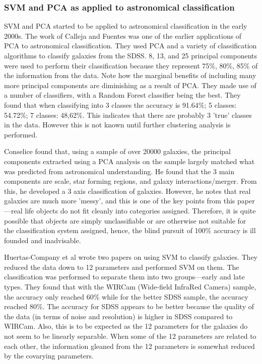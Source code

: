 \documentclass[a4paper,11pt]{article}
\begin{document}
\subsubsection{SVM and PCA as applied to astronomical classification}
SVM and PCA started to be applied to astronomical classification in the early 2000s. The work of Calleja and Fuentes was one of the earlier applications of PCA to astronomical classification.\cite{delacalleja_2004_automated} They used PCA and a variety of classification algorithms to classify galaxies from the SDSS. 8, 13, and 25 principal components were used to perform their classification because they represent 75\%, 80\%, 85\% of the information from the data. Note how the marginal benefits of including many more principal components are diminishing as a result of PCA. They made use of a number of classifiers, with a Random Forest classifier being the best. They found that when classifying into 3 classes the accuracy is 91.64\%; 5 classes: 54.72\%; 7 classes: 48,62\%. This indicates that there are probably 3 'true' classes in the data. However this is not known until further clustering analysis is performed.

Conselice \cite{conselice_2006_the} found that, using a sample of over 20000 galaxies, the principal components extracted using a PCA analysis on the sample largely matched what was predicted from astronomical understanding. He found that the 3 main components are scale, star forming regions, and galaxy interactions/merger. From this, he developed a 3 axis classification of galaxies. However, he notes that real galaxies are much more 'messy', and this is one of the key points from this paper \cite{conselice_2006_the} —real life objects do not fit cleanly into categories assigned. Therefore, it is quite possible that objects are simply unclassifiable or are otherwise not suitable for the classification system assigned, hence, the blind pursuit of 100\% accuracy is ill founded and inadvisable.

Huertas-Company et al \cite{huertascompany_2007_a} wrote two papers on using SVM to classify galaxies. They reduced the data down to 12 parameters and performed SVM on them. The classification was performed to separate them into two groups—early and late types. They found that with the WIRCam (Wide-field InfraRed Camera) sample, the accuracy only reached 60\% while for the better SDSS sample, the accuracy reached 80\%. The accuracy for SDSS appears to be better because the quality of the data (in terms of noise and resolution) is higher in SDSS compared to WIRCam. Also, this is to be expected as the 12 parameters for the galaxies do not seem to be linearly separable. When some of the 12 parameters are related to each other, the information gleaned from the 12 parameters is somewhat reduced by the covarying parameters.
\end{document}
